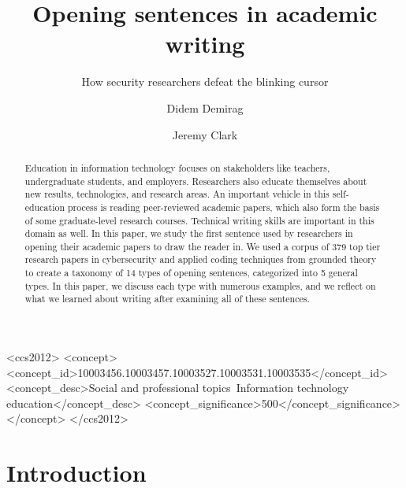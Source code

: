 \documentclass[sigconf,anonymous]{acmart}
\begin{document}
	
	\title{Opening sentences in academic writing}
	\subtitle{How security researchers defeat the blinking cursor}
	
	\author{Didem Demirag}
	\author{Jeremy Clark}
	
	\begin{abstract}
		
		Education in information technology focuses on stakeholders like teachers, undergraduate students, and employers. Researchers also educate themselves about new results, technologies, and research areas. An important vehicle in this self-education process is reading peer-reviewed academic papers, which also form the basis of some graduate-level research courses. Technical writing skills are important in this domain as well. In this paper, we study the first sentence used by researchers in opening their academic papers to draw the reader in. We used a corpus of 379 top tier research papers in cybersecurity and applied coding techniques from grounded theory to create a taxonomy of 14 types of opening sentences, categorized into 5 general types. In this paper, we discuss each type with numerous examples, and we reflect on what we learned about writing after examining all of these sentences.
		
	\end{abstract}
	
	\begin{CCSXML}
		<ccs2012>
		<concept>
		<concept_id>10003456.10003457.10003527.10003531.10003535</concept_id>
		<concept_desc>Social and professional topics~Information technology education</concept_desc>
		<concept_significance>500</concept_significance>
		</concept>
		</ccs2012>
	\end{CCSXML}
	
	
	
	\maketitle
	
	
	\section{Introduction}
	
\end{document}
